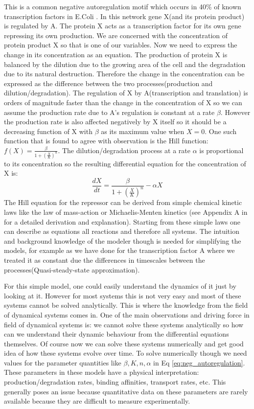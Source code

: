 This is a common negative autoregulation motif which occurs in 40\% of known transcription factors in E.Coli \cite[] {rosenfeld2002negative}. In this network gene X(and its protein product) is regulated by A. The protein X acts as a transcription factor for its own gene repressing its own production. We are concerned with the concentration of protein product X so that is one of our variables. Now we need to express the change in its concentration as an equation. The production of protein X is balanced by the dilution due to the growing area of the cell and the degradation due to its natural destruction. Therefore the change in the concentration can be expressed as the difference between the two processes(production and dilution/degradation).  The regulation of X by A(transcription and translation) is orders of magnitude faster than the change in the concentration of X so we can assume the production rate due to A's regulation is constant at a rate $\beta$. However the production rate is also affected negatively by X itself so it should be a decreasing function of X with $\beta$ as its maximum value when $X=0$. One such function that is found to agree with observation is the Hill function: $ f(X) = \frac{\beta}{1 + \left(\frac{X}{K}\right)^n}$. The dilution/degradation process at a rate $\alpha$ is proportional to its concentration so the resulting differential equation for the concentration of X is:
\begin{equation}
\frac{dX}{dt} = \frac{\beta}{1 + \left(\frac{X}{K}\right)^n} - \alpha X
\label{eq:neg_autoregulation}
\end{equation}
The Hill equation for the repressor can be derived from simple chemical kinetic laws like the law of mass-action \cite{} or Michaelis-Menten kinetics \cite{}(see Appendix A in \cite[] {alon2007introduction} for a detailed derivation and explanation). Starting from these simple laws one can describe as equations all reactions and therefore all systems. The intuition and background knowledge of the modeler though is needed for simplifying the models, for example as we have done for the transcription factor A where we treated it as constant due the differences in timescales between the processes(Quasi-steady-state approximation). 

For this simple model, one could easily understand the dynamics of it just by looking at it. However for most systems this is not very easy and most of these systems cannot be solved analytically. This is where the knowledge from the field of dynamical systems comes in. One of the main observations and driving force in field of dynamical systems is: we cannot solve these systems analytically so how can we understand their dynamic behaviour from the differential equations themselves. Of course now we can solve these systems numerically and get  good idea of how these systems evolve over time. To solve numerically though we need values for the parameter quantities like $\beta, K, n, \alpha$ in Eq \ref{eq:neg_autoregulation}. These parameters in these models have a physical interpretation: production/degradation rates, binding affinities, transport rates, etc. This generally poses an issue because quantitative data on these parameters are rarely available because they are difficult to measure experimentally. 

